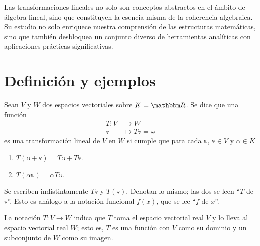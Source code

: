 Las transformaciones lineales no solo son conceptos abstractos en el ámbito de álgebra lineal, sino que constituyen la esencia misma de la coherencia algebraica. Su estudio no solo enriquece nuestra comprensión de las estructuras matemáticas, sino que también desbloquea un conjunto diverso de herramientas analíticas con aplicaciones prácticas significativas.

\section{Definición y ejemplos}

\begin{definition}\label{def:operatorlineal}
    Sean $V$ y $W$ dos espacios vectoriales sobre $K = \RR$. Se dice que una función
    \begin{align*}
        T: V & \longrightarrow W \\
        \mathbb{v} & \longmapsto T\mathbb{v} = \mathbb{w}
    \end{align*}
    es una transformación lineal de $V$ en $W$ si cumple que para cada $\mathbb{u}$, $\mathbb{v} \in V$ y $\alpha \in K$
    \begin{enumerate}[label=\roman*)]
        \item $T(\mathbb{u} + \mathbb{v}) = T\mathbb{u} + T\mathbb{v}$.
        \item $T(\alpha \mathbb{u}) = \alpha T\mathbb{u}$.
    \end{enumerate}
\end{definition}

\begin{notation}
    Se escriben indistintamente $T\mathbb{v}$ y $T(\mathbb{v})$. Denotan lo mismo; las dos se leen “$T$ de $\mathbb{v}$”. Esto es análogo a la notación funcional $f(x)$, que se lee “$f$ de $x$”.
\end{notation}

\begin{observation}
    La notación $T: V \longrightarrow W$ indica que $T$ toma el espacio vectorial real $V$ y lo lleva al espacio vectorial real $W$; esto es, $T$ es una función con $V$ como su dominio y un subconjunto de $W$ como su imagen.
\end{observation}

